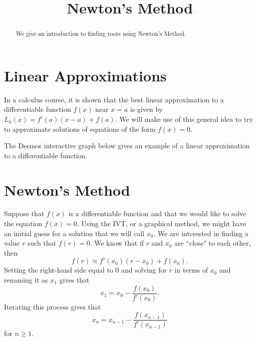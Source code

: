 \documentclass{ximera}
\title{Newton's Method}
\begin{document}
  
\begin{abstract}  
We give an introduction to finding roots using Newton's Method.
\end{abstract}  
\maketitle

\section{Linear Approximations}

In a calculus course, it is shown that the best linear approximation to a differentiable function $f(x)$ near $x=a$ is given by $L_a(x)=f'(a)(x-a)+f(a)$. We will make use of this general idea to try to approximate solutions of equations of the form $f(x)=0$. 

The Desmos interactive graph below gives an example of a linear approximation to a differentiable function.


\section{Newton's Method}

Suppose that $f(x)$ is a differentiable function and that we would like to solve the equation $f(x)=0$. Using the IVT, or a graphical method, we might have an initial guess for a solution that we will call $x_0$. We are interested in finding a value $r$ such that $f(r)=0$. We know that if $r$ and $x_0$ are ``close" to each other, then $$f(r)\approx f'(x_0)(r-x_0)+f(x_0).$$ Setting the right-hand side equal to 0 and solving for $r$ in terms of $x_0$ and renaming it as $x_1$ gives that $$x_1=x_0-\frac{f(x_0)}{f'(x_0)}.$$ Iterating this process gives that $$x_n=x_{n-1}-\frac{f(x_{n-1})}{f'(x_{n-1})}$$ for $n\geq 1$.  

\end{document}
